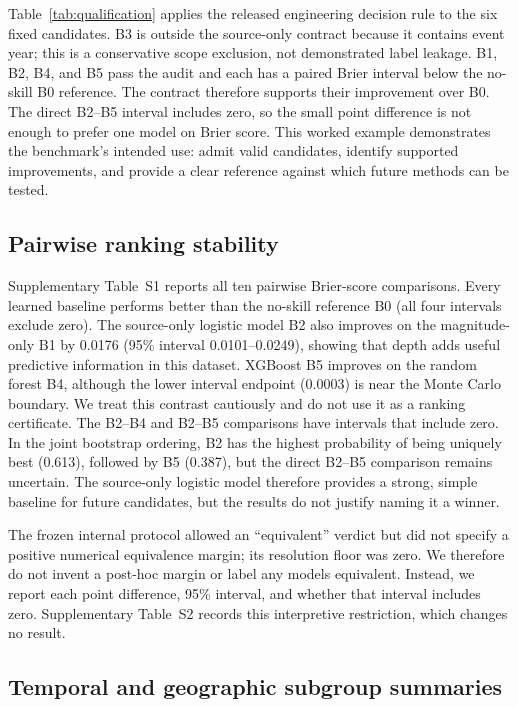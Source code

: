 \documentclass[pdflatex,sn-basic,Numbered]{sn-jnl}
\begin{document}
Table~\ref{tab:qualification} applies the released engineering decision rule to
the six fixed candidates. B3 is outside the source-only contract because it
contains event year; this is a conservative scope exclusion, not demonstrated
label leakage. B1, B2, B4, and B5 pass the audit and each has a paired
Brier interval below the no-skill B0 reference. The contract therefore supports
their improvement over B0. The direct B2--B5 interval includes zero, so the
small point difference is not enough to prefer one model on Brier score. This
worked example demonstrates the benchmark's intended use: admit valid
candidates, identify supported improvements, and provide a clear reference
against which future methods can be tested.



\subsection{Pairwise ranking stability}\label{sec:pairwise-results}

Supplementary Table~S1 reports all ten pairwise Brier-score comparisons. Every
learned baseline performs better than the no-skill reference B0 (all four
intervals exclude zero). The source-only logistic model B2 also improves on the
magnitude-only B1 by 0.0176 (95\% interval 0.0101--0.0249), showing that depth
adds useful predictive information in this dataset. XGBoost B5 improves on the
random forest B4, although the lower interval endpoint (0.0003) is near the
Monte Carlo boundary. We treat this contrast cautiously and do not use it as a
ranking certificate. The B2--B4 and B2--B5 comparisons have intervals that
include zero. In the joint
bootstrap ordering, B2 has the highest probability of being uniquely best
(0.613), followed by B5 (0.387), but the direct B2--B5 comparison remains
uncertain. The source-only logistic model therefore provides a strong,
simple baseline for future candidates, but the results do not justify naming it
a winner.

The frozen internal protocol allowed an ``equivalent'' verdict but did not specify a
positive numerical equivalence margin; its resolution floor was zero. We
therefore do not invent a post-hoc margin or label any models equivalent.
Instead, we report each point difference, 95\% interval, and
whether that interval includes zero. Supplementary Table~S2 records this
interpretive restriction, which changes no result.

\subsection{Temporal and geographic subgroup summaries}\label{sec:slices-results}
\end{document}

